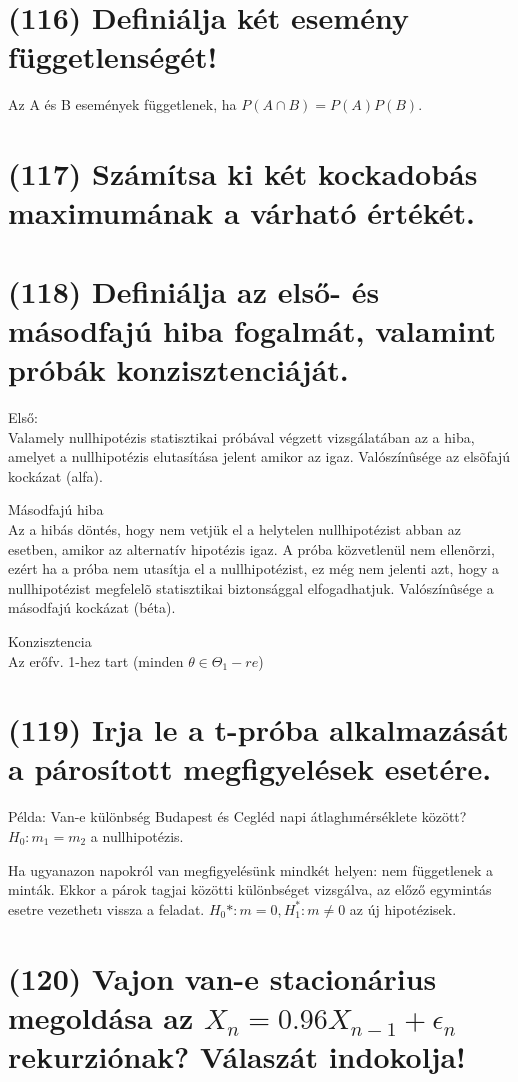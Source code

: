 \documentclass[12p]{article}
\begin{document}
\section{(116) Definiálja két esemény függetlenségét!}

Az A és B események függetlenek, ha $P(A \cap B) = P(A)P(B)$.

\section{(117) Számítsa ki két kockadobás maximumának a várható értékét.}

\section{(118) Definiálja az első- és másodfajú hiba fogalmát, valamint próbák konzisztenciáját.}

Első:\\
Valamely nullhipotézis statisztikai próbával végzett vizsgálatában az a hiba, amelyet a nullhipotézis elutasítása jelent amikor az igaz. Valószínûsége az elsõfajú kockázat (alfa). 

Másodfajú hiba\\
Az a hibás döntés, hogy nem vetjük el a helytelen nullhipotézist abban az esetben, amikor az alternatív hipotézis igaz. A próba közvetlenül nem ellenõrzi, ezért ha a próba nem utasítja el a nullhipotézist, ez még nem jelenti azt, hogy a nullhipotézist megfelelõ statisztikai biztonsággal elfogadhatjuk. Valószínûsége a másodfajú kockázat (béta). 

Konzisztencia\\
Az erőfv. 1-hez tart (minden $\theta \in \Theta_1-re$)


\section{(119) Irja le a t-próba alkalmazását a párosított megfigyelések esetére.}

Példa: Van-e különbség Budapest és Cegléd napi átlaghımérséklete között?$H_0: m_1=m_2$ a nullhipotézis. 

Ha ugyanazon napokról van megfigyelésünk
mindkét helyen: nem függetlenek a minták.
Ekkor a párok tagjai közötti különbséget
vizsgálva, az előző egymintás esetre
vezethetı vissza a feladat. $H_0*: m=0 ,H_1^{*}:m\neq0$ az új hipotézisek. 


\section{(120) Vajon van-e stacionárius megoldása az $X_n = 0.96 X_{n-1} + \epsilon_n$ rekurziónak? Válaszát
indokolja!}
\end{document}
